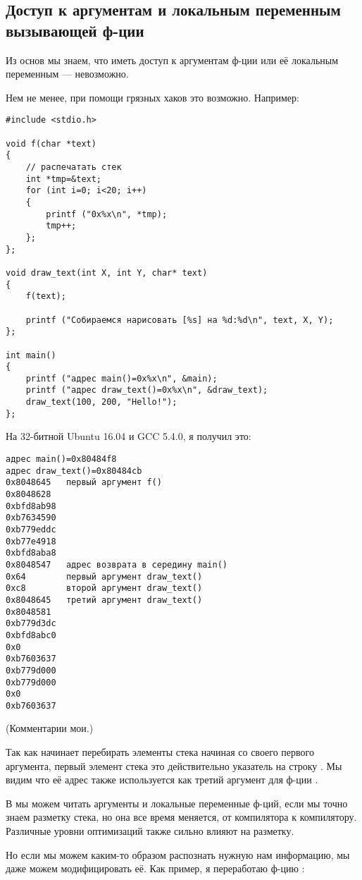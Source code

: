 \subsection{Доступ к аргументам и локальным переменным вызывающей ф-ции}

Из основ \CCpp мы знаем, что иметь доступ к аргументам ф-ции или её локальным переменным --- невозможно.

Нем не менее, при помощи грязных хаков это возможно.
Например:

\begin{lstlisting}[style=customc]
#include <stdio.h>

void f(char *text)
{
	// распечатать стек
	int *tmp=&text;
	for (int i=0; i<20; i++)
	{
		printf ("0x%x\n", *tmp);
		tmp++;
	};
};

void draw_text(int X, int Y, char* text)
{
	f(text);

	printf ("Собираемся нарисовать [%s] на %d:%d\n", text, X, Y);
};

int main()
{
	printf ("адрес main()=0x%x\n", &main);
	printf ("адрес draw_text()=0x%x\n", &draw_text);
	draw_text(100, 200, "Hello!");
};
\end{lstlisting}

На 32-битной Ubuntu 16.04 и GCC 5.4.0, я получил это:

\begin{lstlisting}
адрес main()=0x80484f8
адрес draw_text()=0x80484cb
0x8048645	первый аргумент f()
0x8048628
0xbfd8ab98
0xb7634590
0xb779eddc
0xb77e4918
0xbfd8aba8
0x8048547	адрес возврата в середину main()
0x64		первый аргумент draw_text()
0xc8		второй аргумент draw_text()
0x8048645	третий аргумент draw_text()
0x8048581
0xb779d3dc
0xbfd8abc0
0x0
0xb7603637
0xb779d000
0xb779d000
0x0
0xb7603637
\end{lstlisting}

(Комментарии мои.)

Так как  начинает перебирать элементы стека начиная со своего первого аргумента, первый элемент стека это
действительно указатель на строку .
Мы видим что её адрес также используется как третий аргумент для ф-ции .

В  мы можем читать аргументы и локальные переменные ф-ций, если мы точно знаем разметку стека, но она все время
меняется, от компилятора к компилятору.
Различные уровни оптимизаций также сильно влияют на разметку.

Но если мы можем каким-то образом распознать нужную нам информацию, мы даже можем модифицировать её.
Как пример, я переработаю ф-цию :

